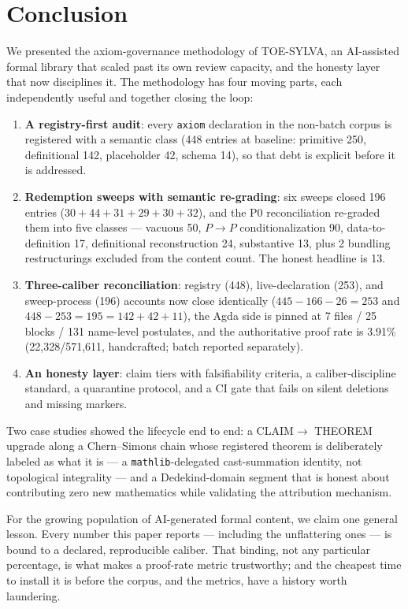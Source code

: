 
\section{Conclusion}
\label{sec:conclusion}

We presented the axiom-governance methodology of TOE-SYLVA, an
AI-assisted formal library that scaled past its own review
capacity, and the honesty layer that now disciplines it. The
methodology has four moving parts, each independently useful and
together closing the loop:

\begin{enumerate}
\item \textbf{A registry-first audit}: every \texttt{axiom}
declaration in the non-batch corpus is registered with a semantic
class (448 entries at baseline: primitive 250, definitional 142,
placeholder 42, schema 14), so that debt is explicit before it is
addressed.
\item \textbf{Redemption sweeps with semantic re-grading}: six
sweeps closed 196 entries ($30+44+31+29+30+32$), and the P0
reconciliation re-graded them into five classes --- vacuous 50,
$P\!\to\!P$ conditionalization 90, data-to-definition 17,
definitional reconstruction 24, substantive 13, plus 2 bundling
restructurings excluded from the content count. The honest
headline is 13.
\item \textbf{Three-caliber reconciliation}: registry (448),
live-declaration (253), and sweep-process (196) accounts now close
identically ($445-166-26=253$ and $448-253=195=142+42+11$), the
Agda side is pinned at 7 files / 25 blocks / 131 name-level
postulates, and the authoritative proof rate is 3.91\%
(22,328/571,611, handcrafted; batch reported separately).
\item \textbf{An honesty layer}: claim tiers with falsifiability
criteria, a caliber-discipline standard, a quarantine protocol,
and a CI gate that fails on silent deletions and missing markers.
\end{enumerate}

Two case studies showed the lifecycle end to end: a CLAIM$\to$
THEOREM upgrade along a Chern--Simons chain whose registered
theorem is deliberately labeled as what it is --- a
\texttt{mathlib}-delegated cast-summation identity, not
topological integrality --- and a Dedekind-domain segment that is
honest about contributing zero new mathematics while validating
the attribution mechanism.

For the growing population of AI-generated formal content, we
claim one general lesson. Every number this paper reports ---
including the unflattering ones --- is bound to a declared,
reproducible caliber. That binding, not any particular
percentage, is what makes a proof-rate metric trustworthy; and
the cheapest time to install it is before the corpus, and the
metrics, have a history worth laundering.
